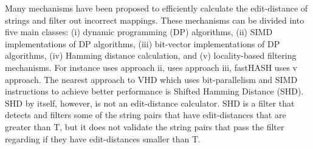 Many mechanisms have been proposed to efficiently calculate the edit-distance of strings and filter out incorrect mappings. These mechanisms can be divided into five main classes: (i) dynamic programming (DP) algorithms, (ii) SIMD implementations of DP algorithms, (iii) bit-vector implementations of DP algorithms, (iv) Hamming distance calculation, and (v) locality-based filtering mechanisms. For instance \cite{swps3} uses approach ii, \cite{seqan} uses approach iii, fastHASH\cite{fasthash} uses v approach. The nearest approach to VHD which uses bit-parallelism and SIMD instructions to achieve better performance is Shifted Hamming Distance (SHD)\cite{shd}. SHD by itself, however, is not an edit-distance calculator. SHD is a filter that detects and filters some of the string pairs that have edit-distances that are greater than T, but it does not validate the string pairs that pass the filter regarding if they have edit-distances smaller than T.
  
  
  